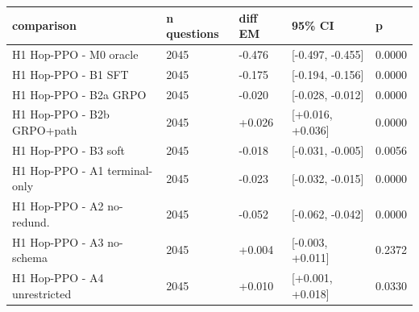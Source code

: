 \begin{tabular}{lllll}
\toprule
comparison & n questions & diff EM & 95\% CI & p \\
\midrule
H1 Hop-PPO - M0 oracle & 2045 & -0.476 & [-0.497, -0.455] & 0.0000 \\
H1 Hop-PPO - B1 SFT & 2045 & -0.175 & [-0.194, -0.156] & 0.0000 \\
H1 Hop-PPO - B2a GRPO & 2045 & -0.020 & [-0.028, -0.012] & 0.0000 \\
H1 Hop-PPO - B2b GRPO+path & 2045 & +0.026 & [+0.016, +0.036] & 0.0000 \\
H1 Hop-PPO - B3 soft & 2045 & -0.018 & [-0.031, -0.005] & 0.0056 \\
H1 Hop-PPO - A1 terminal-only & 2045 & -0.023 & [-0.032, -0.015] & 0.0000 \\
H1 Hop-PPO - A2 no-redund. & 2045 & -0.052 & [-0.062, -0.042] & 0.0000 \\
H1 Hop-PPO - A3 no-schema & 2045 & +0.004 & [-0.003, +0.011] & 0.2372 \\
H1 Hop-PPO - A4 unrestricted & 2045 & +0.010 & [+0.001, +0.018] & 0.0330 \\
\bottomrule
\end{tabular}

